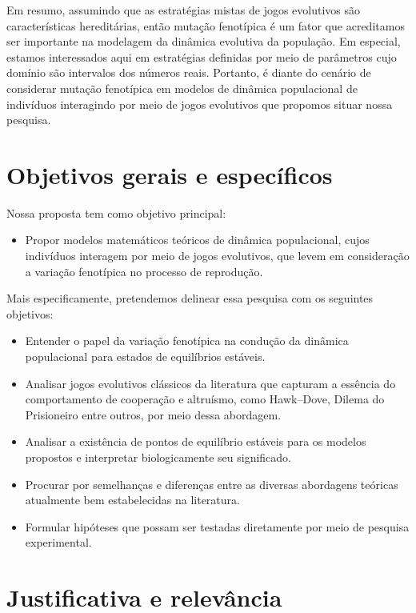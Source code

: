 \documentclass[
	12pt,				%
	openany,			%
	oneoside,			%
	a4paper,			%
	english,			%
	spanish,			%
	brazil,				%
	]{abntex2}
\begin{document}
Em resumo, assumindo que as estratégias mistas de jogos evolutivos são características hereditárias, então mutação fenotípica é um fator que acreditamos ser importante na modelagem da dinâmica evolutiva da população. Em especial, estamos interessados aqui em estratégias definidas por meio de  parâmetros cujo domínio são intervalos dos números reais. Portanto, é diante do cenário de considerar mutação fenotípica  em modelos de dinâmica populacional de indivíduos interagindo por meio de jogos evolutivos que propomos situar nossa pesquisa.


\chapter{Objetivos gerais e específicos}
Nossa proposta tem como objetivo principal:

\begin{itemize} \item Propor  modelos matemáticos teóricos de dinâmica populacional, cujos indivíduos interagem por meio de jogos evolutivos, que levem em consideração a variação fenotípica no processo de reprodução. 
\end{itemize}


Mais especificamente, pretendemos delinear essa pesquisa com os seguintes objetivos:
\begin{itemize}
\item Entender o papel da variação fenotípica na condução da dinâmica populacional para estados de equilíbrios estáveis.
\item Analisar jogos evolutivos clássicos da literatura que capturam a essência do comportamento de cooperação e altruísmo, como Hawk--Dove, Dilema do Prisioneiro entre outros,  por meio dessa abordagem.
\item Analisar a existência de pontos de equilíbrio estáveis para os modelos propostos e interpretar biologicamente seu significado. 
\item Procurar por semelhanças e diferenças entre as diversas abordagens teóricas atualmente bem estabelecidas na literatura.
\item Formular hipóteses que possam ser testadas diretamente por meio de pesquisa experimental.
\end{itemize}


\chapter{Justificativa e relevância}
\end{document}
